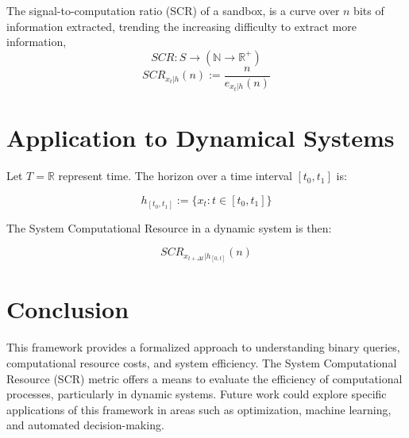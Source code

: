 \documentclass[11pt,a4paper]{article}
\theoremstyle{definition}
\theoremstyle{remark}
\numberwithin{equation}{section}
\begin{document}
The signal-to-computation ratio (SCR) of a sandbox, is a curve over $n$ bits of information extracted, trending the increasing difficulty to extract more information,
\[
SCR : S \rightarrow (\mathbb{N} \rightarrow \mathbb{R}^+)
\]
\[
SCR_{x_t|h}(n) := \frac{n}{e_{x_t|h}(n)}
\]

\section{Application to Dynamical Systems}

Let $T = \mathbb{R}$ represent time. The horizon over a time interval $[t_0, t_1]$ is:

\[
h_{[t_0, t_1]} := \{ x_t : t \in [t_0, t_1] \}
\]

The System Computational Resource in a dynamic system is then:

\[
SCR_{x_{t+\Delta t} | h_{[0,t]}}(n)
\]

\section{Conclusion}

This framework provides a formalized approach to understanding binary queries, computational resource costs, and system efficiency. The System Computational Resource (SCR) metric offers a means to evaluate the efficiency of computational processes, particularly in dynamic systems. Future work could explore specific applications of this framework in areas such as optimization, machine learning, and automated decision-making.



\end{document}

